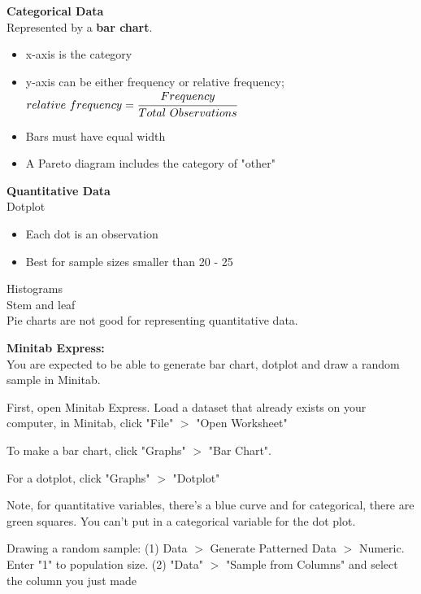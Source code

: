 \documentclass[12pt]{article}
\begin{document}
\noindent \textbf{Categorical Data}\\
\noindent Represented by a \textbf{bar chart}.
\begin{itemize}[noitemsep,nolistsep]
\item x-axis is the category
\item y-axis can be either frequency or relative frequency;
\noindent $relative\ frequency = \cfrac{Frequency}{Total\ Observations}$
\item Bars must have equal width
\item A Pareto diagram includes the category of "other"
\end{itemize}

\noindent \textbf{Quantitative Data} \\
\noindent Dotplot
\begin{itemize}[noitemsep, nolistsep]
\item Each dot is an observation
\item Best for sample sizes smaller than 20 - 25
\end{itemize}

\noindent Histograms \\
\noindent Stem and leaf \\
\noindent Pie charts are not good for representing quantitative data. 


\noindent \textbf{Minitab Express:} \\
\noindent You are expected to be able to generate bar chart, dotplot and draw a random sample in Minitab.

\noindent First, open Minitab Express. Load a dataset that already exists on your computer, in Minitab, click "File" $>$ "Open Worksheet"

\noindent To make a bar chart, click "Graphs" $>$ "Bar Chart".

\noindent For a dotplot, click "Graphs" $>$ "Dotplot"

\noindent Note, for quantitative variables, there's a blue curve and for categorical, there are green squares. You can't put in a categorical variable for the dot plot. 

\noindent Drawing a random sample: (1) Data $>$ Generate Patterned Data $>$ Numeric. Enter "1" to population size. (2) "Data" $>$ "Sample from Columns" and select the column you just made

 
\end{document}

